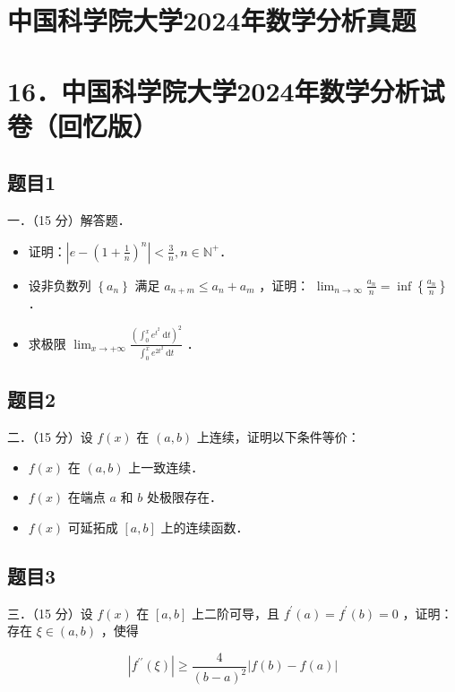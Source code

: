 \documentclass{article}
\begin{document}
\section*{中国科学院大学2024年数学分析真题}
\section*{16．中国科学院大学2024年数学分析试卷（回忆版）}

\subsection{题目1}
一．（15 分）解答题．

\begin{itemize}
  \item[（1）] 证明：\(\left|e-\left(1+\frac{1}{n}\right)^{n}\right|<\frac{3}{n}, n \in \mathbb{N}^{+}\)．
  \item[（2）] 设非负数列 \(\left\{a_{n}\right\}\) 满足 \(a_{n+m} \leq a_{n}+a_{m}\) ，证明： \(\lim _{n \rightarrow \infty} \frac{a_{n}}{n}=\inf \left\{\frac{a_{n}}{n}\right\}\) ．
  \item[（3）] 求极限 \(\lim _{x \rightarrow+\infty} \frac{\left(\int_{0}^{x} e^{t^{2}} \mathrm{~d} t\right)^{2}}{\int_{0}^{x} e^{2 t^{2}} \mathrm{~d} t}\) ．
\end{itemize}

\subsection{题目2}
二．（15 分）设 \(f(x)\) 在 \((a, b)\) 上连续，证明以下条件等价：

\begin{itemize}
  \item[（1）] \(f(x)\) 在 \((a, b)\) 上一致连续．
  \item[（2）] \(f(x)\) 在端点 \(a\) 和 \(b\) 处极限存在．
  \item[（3）] \(f(x)\) 可延拓成 \([a, b]\) 上的连续函数．
\end{itemize}

\subsection{题目3}
三．（15 分）设 \(f(x)\) 在 \([a, b]\) 上二阶可导，且 \(f^{\prime}(a)=f^{\prime}(b)=0\) ，证明：存在 \(\xi \in(a, b)\) ，使得

\[
\left|f^{\prime \prime}(\xi)\right| \geq \frac{4}{(b-a)^{2}}|f(b)-f(a)|
\]
\end{document}
